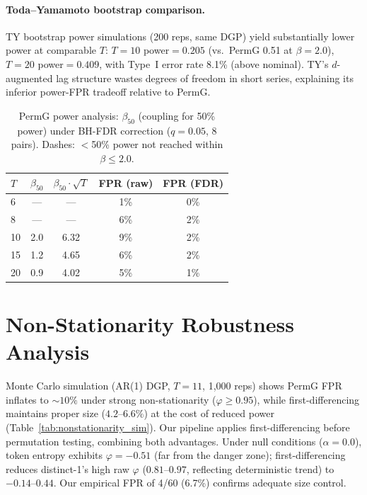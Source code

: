 \paragraph{Toda--Yamamoto bootstrap comparison.}
TY bootstrap power simulations (200 reps, same DGP) yield substantially lower power at comparable $T$: $T{=}10$ power${=}0.205$ (vs.\ PermG 0.51 at $\beta{=}2.0$), $T{=}20$ power${=}0.409$, with Type~I error rate 8.1\% (above nominal).
TY's $d$-augmented lag structure wastes degrees of freedom in short series, explaining its inferior power-FPR tradeoff relative to PermG.

\begin{table}[t]
\centering
\small
\caption{PermG power analysis: $\beta_{50}$ (coupling for 50\% power) under BH-FDR correction ($q{=}0.05$, 8 pairs). Dashes: $<$50\% power not reached within $\beta \leq 2.0$.}
\label{tab:beta50}
\begin{tabular}{lcccc}
\toprule
$T$ & $\beta_{50}$ & $\beta_{50} \cdot \sqrt{T}$ & FPR (raw) & FPR (FDR) \\
\midrule
6  & ---  & ---  & 1\% & 0\% \\
8  & ---  & ---  & 6\% & 2\% \\
10 & 2.0  & 6.32 & 9\% & 2\% \\
15 & 1.2  & 4.65 & 6\% & 2\% \\
20 & 0.9  & 4.02 & 5\% & 1\% \\
\bottomrule
\end{tabular}
\end{table}


\section{Non-Stationarity Robustness Analysis}
\label{app:nonstationarity}

Monte Carlo simulation (AR(1) DGP, $T{=}11$, 1{,}000 reps) shows PermG FPR inflates to ${\sim}10\%$ under strong non-stationarity ($\varphi{\geq}0.95$), while first-differencing maintains proper size ($4.2$--$6.6\%$) at the cost of reduced power (Table~\ref{tab:nonstationarity_sim}).
Our pipeline applies first-differencing before permutation testing, combining both advantages.
Under null conditions ($\alpha{=}0.0$), token entropy exhibits $\varphi{=}-0.51$ (far from the danger zone); first-differencing reduces distinct-1's high raw $\varphi$ ($0.81$--$0.97$, reflecting deterministic trend) to $-0.14$--$0.44$.
Our empirical FPR of 4/60 (6.7\%) confirms adequate size control.

